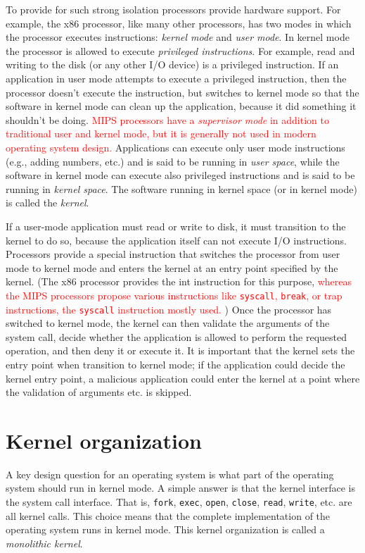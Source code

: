 \documentclass{report}
\begin{document}
	To provide for such strong isolation processors provide hardware support. For
	example, the x86 processor, like many other processors, has two modes in which the
	processor executes instructions: \emph{kernel mode} and \emph{user mode}. In kernel mode the
	processor is allowed to execute \emph{privileged instructions}. For example, read and writing
	to the disk (or any other I/O device) is a privileged instruction. If an application
	in user mode attempts to execute a privileged instruction, then the processor doesn't
	execute the instruction, but switches to kernel mode so that the software in kernel
	mode can clean up the application, because it did something it shouldn't be doing.
	\textcolor{red}{
		MIPS processors have a \emph{supervisor mode} in addition to traditional
		user and kernel mode, but it is generally not used in modern operating system design.
	}
	Applications can execute only user mode instructions (e.g., adding numbers, etc.) and 
	is said to be running in \emph{user
	space}, while the software in kernel mode can execute also privileged instructions and
	is said to be running in \emph{kernel space}. The software running in kernel space (or in
	kernel mode) is called the \emph{kernel}.
	
	If a user-mode application must read or write to disk, it must transition to the
	kernel to do so, because the application itself can not execute I/O instructions. Processors 
	provide a special instruction that switches the processor from user mode to kernel
	mode and enters the kernel at an entry point specified by the kernel. (The x86 processor 
	provides the int instruction for this purpose, \textcolor{red}{
		whereas the MIPS processors propose various instructions like \texttt{syscall},
		\texttt{break}, or trap instructions, the \texttt{syscall} instruction mostly
		used.
	}) Once the processor has switched to
	kernel mode, the kernel can then validate the arguments of the system call, decide
	whether the application is allowed to perform the requested operation, and then deny
	it or execute it. It is important that the kernel sets the entry point when transition to
	kernel mode; if the application could decide the kernel entry point, a malicious 
	application could enter the kernel at a point where the validation of arguments etc. is
	skipped.
	
	\section{Kernel organization}
	A key design question for an operating system is what part of the operating system 
	should run in kernel mode. A simple answer is that the kernel interface is the system 
	call interface. That is, 
	\texttt{fork}, \texttt{exec}, \texttt{open}, \texttt{close}, \texttt{read}, \texttt{write}, 
	etc. are all kernel
	calls. This choice means that the complete implementation of the operating system
	runs in kernel mode. This kernel organization is called a \emph{monolithic kernel}.
	
\end{document}
